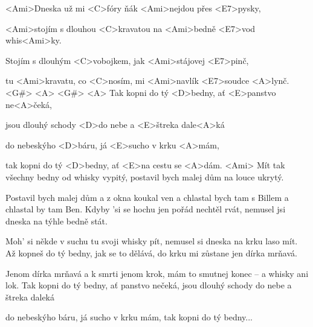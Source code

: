 
\zs
<Ami>Dneska už mi <C>fóry ňák <Ami>nejdou přes <E7>pysky,

<Ami>stojím s dlouhou <C>kravatou na <Ami>bedně <E7>vod whis<Ami>ky.

Stojím s dlouhým <C>vobojkem, jak <Ami>stájovej <E7>pinč,

tu <Ami>kravatu, co <C>nosím, mi <Ami>navlík <E7>soudce <A>lynč. <G#> <A> <G#> <A>
\ks
\zr
Tak kopni do tý <D>bedny, ať <E>panstvo ne<A>čeká,

jsou dlouhý schody <D>do nebe a <E>štreka dale<A>ká

do nebeskýho <D>báru, já <E>sucho v krku <A>mám,

tak kopni do tý <D>bedny, ať <E>na cestu se <A>dám. <Ami>
\kr
\zs
Mít tak všechny bedny od whisky vypitý,
postavil bych malej dům na louce ukrytý.

Postavil bych malej dům a z okna koukal ven
a chlastal bych tam s Billem a chlastal by tam Ben.
\ks
\zr \kr
\zs
Kdyby 'si se hochu jen pořád nechtěl rvát,
nemusel jsi dneska na týhle bedně stát.

Moh' si někde v suchu tu svoji whisky pít,
nemusel si dneska na krku laso mít.
\ks
\zr \kr
\zs
Až kopneš do tý bedny, jak se to dělává,
do krku mi zůstane jen dírka mrňavá.

Jenom dírka mrňavá a k smrti jenom krok,
mám to smutnej konec -- a whisky ani lok.
\ks
\zr
Tak kopni do tý bedny, ať panstvo nečeká,
jsou dlouhý schody do nebe a štreka daleká

do nebeskýho báru, já sucho v krku mám,
tak kopni do tý bedny...
\kr

\kp






















